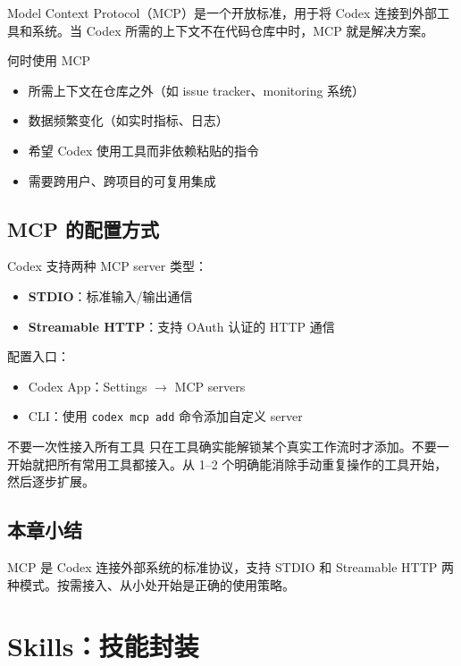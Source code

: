 \documentclass[a4paper]{article}
\begin{document}
Model Context Protocol（MCP）是一个开放标准，用于将 Codex 连接到外部工具和系统。当 Codex 所需的上下文不在代码仓库中时，MCP 就是解决方案。

\begin{importantbox}{何时使用 MCP}
\begin{itemize}[nosep]
    \item 所需上下文在仓库之外（如 issue tracker、monitoring 系统）
    \item 数据频繁变化（如实时指标、日志）
    \item 希望 Codex 使用工具而非依赖粘贴的指令
    \item 需要跨用户、跨项目的可复用集成
\end{itemize}
\end{importantbox}

\subsection{MCP 的配置方式}

Codex 支持两种 MCP server 类型：

\begin{itemize}
    \item \textbf{STDIO}：标准输入/输出通信
    \item \textbf{Streamable HTTP}：支持 OAuth 认证的 HTTP 通信
\end{itemize}

配置入口：
\begin{itemize}
    \item Codex App：Settings $\rightarrow$ MCP servers
    \item CLI：使用 \texttt{codex mcp add} 命令添加自定义 server
\end{itemize}

\begin{warningbox}{不要一次性接入所有工具}
只在工具确实能解锁某个真实工作流时才添加。不要一开始就把所有常用工具都接入。从 1--2 个明确能消除手动重复操作的工具开始，然后逐步扩展。
\end{warningbox}

\subsection{本章小结}

MCP 是 Codex 连接外部系统的标准协议，支持 STDIO 和 Streamable HTTP 两种模式。按需接入、从小处开始是正确的使用策略。

\section{Skills：技能封装}
\end{document}
